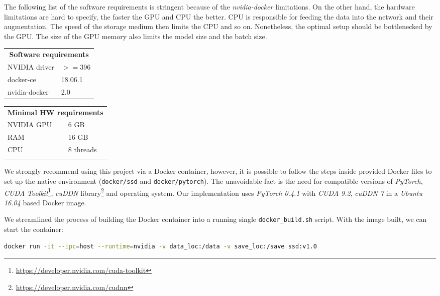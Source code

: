 The following list of the software requirements is stringent because of the \textit{nvidia-docker} limitations. On the other hand, the hardware limitations are hard to specify, the faster the GPU and CPU the better. CPU is responsible for feeding the data into the network and their augmentation. The speed of the storage medium then limits the CPU and so on. Nonetheless, the optimal setup should be bottlenecked by the GPU. The size of the GPU memory also limits the model size and the batch size.

\begin{multicols}{2}
\begin{tabular}{l l}
    \multicolumn{2}{c}{\textbf{Software requirements}} \\
    NVIDIA driver & $>=$396\\
    docker-ce & 18.06.1 \\
    nvidia-docker & 2.0 \\
\end{tabular}

\begin{tabular}{l l}
    \multicolumn{2}{c}{\textbf{Minimal HW requirements}} \\
    NVIDIA GPU & 6 GB  \\
    RAM & 16 GB\\
    CPU & 8 threads \\
     \\
\end{tabular}
\end{multicols}

We strongly recommend using this project via a Docker container, however, it is possible to follow the steps inside provided Docker files to set up the native environment ({\tt docker/ssd} and {\tt docker/pytorch}). The unavoidable fact is the need for compatible versions of \textit{PyTorch}, \textit{CUDA Toolkit}\footnote{\url{https://developer.nvidia.com/cuda-toolkit}}, \textit{cuDDN} library\footnote{\url{https://developer.nvidia.com/cudnn}} and operating system. Our implementation uses \textit{PyTorch 0.4.1} with \textit{CUDA 9.2}, \textit{cuDDN 7} in a \textit{Ubuntu 16.04} based Docker image.

We streamlined the process of building the Docker container into a running single {\tt docker\_build.sh} script. With the image built, we can start the container:

\begin{lstlisting}[breaklines, frame=single, language=Bash, basicstyle=\ttfamily]
  docker run -it --ipc=host --runtime=nvidia -v data_loc:/data -v save_loc:/save ssd:v1.0
\end{lstlisting}

